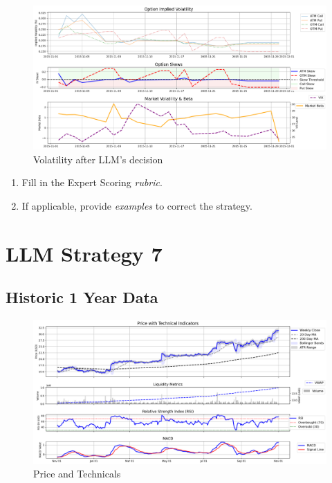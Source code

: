 \documentclass[8pt]{scrartcl}
\begin{document}
\begin{figure}[H]
    \centering
    \includegraphics[width=1\linewidth]{judge_reviews/MSFT_M_gpt-4o-mini/2015-11-02/llm_Market_Volatility_&_Beta.png}
    \caption{Volatility after LLM's decision}
\end{figure}

\begin{tcolorbox}[colback=blue!10, colframe=blue!60, title=\textbf{TASKS}, sharp corners=southwest]
\begin{enumerate}
    \item Fill in the Expert Scoring \textit{rubric}.
    \item If applicable, provide \textit{examples} to correct the strategy.
\end{enumerate}
\end{tcolorbox}
\newpage


\section*{LLM Strategy 7}
\label{app:s7}
\subsection*{Historic 1 Year Data}

\begin{figure}[H]
    \centering
    \includegraphics[width=1\linewidth]{judge_reviews/AMZN_M_gpt-4o-mini/2015-11-02/judge_Price_with_Technical_Indicators.png}
    \caption{Price and Technicals}
\end{figure}
\end{document}
